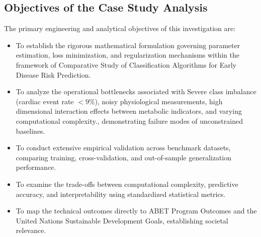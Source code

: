 \subsection{Objectives of the Case Study Analysis}
The primary engineering and analytical objectives of this investigation are:
\begin{itemize}
  \item To establish the rigorous mathematical formulation governing parameter estimation, loss minimization, and regularization mechanisms within the framework of Comparative Study of Classification Algorithms for Early Disease Risk Prediction.
  \item To analyze the operational bottlenecks associated with Severe class imbalance (cardiac event rate $< 9\%$), noisy physiological measurements, high dimensional interaction effects between metabolic indicators, and varying computational complexity., demonstrating failure modes of unconstrained baselines.
  \item To conduct extensive empirical validation across benchmark datasets, comparing training, cross-validation, and out-of-sample generalization performance.
  \item To examine the trade-offs between computational complexity, predictive accuracy, and interpretability using standardized statistical metrics.
  \item To map the technical outcomes directly to ABET Program Outcomes and the United Nations Sustainable Development Goals, establishing societal relevance.
\end{itemize}
